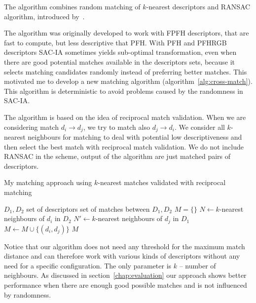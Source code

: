 The algorithm combines random matching of $k$-nearest descriptors and \gls{RANSAC} algorithm, introduced by~\citet{fischler1981ransac}.


The algorithm was originally developed to work with \gls{FPFH} descriptors, that are fast to compute, but less descriptive that \gls{PFH}. With \gls{PFH} and \gls{PFHRGB} descriptors \gls{SAC-IA} sometimes yields sub-optimal transformation, even when there are good potential matches available in the descriptors sets, because it selects matching candidates randomly instead of preferring better matches. This motivated me to develop a new matching algorithm (algorithm~\ref{alg:cross-match}). This algorithm is deterministic to avoid problems caused by the randomness in \gls{SAC-IA}.

The algorithm is based on the idea of reciprocal match validation. When we are considering match $d_i \rightarrow d_j$, we try to match also $d_j \rightarrow d_i$. We consider all $k$-nearest neighbours for matching to deal with potential low descriptiveness and then select the best match with reciprocal match validation. We do not include \gls{RANSAC} in the scheme, output of the algorithm are just matched pairs of descriptors.

\begin{algorithm}
    \caption[Reciprocal $k$-nearest matching]{My matching approach using $k$-nearest matches validated with reciprocal matching}
    \label{alg:cross-match}
    \begin{algorithmic}[1]
        \Require $D_1, D_2$ set of descriptors
        \Ensure set of matches between $D_1, D_2$
            \State $M = \{\}$
                \State $N \gets k$-nearest neighbours of $d_i$ in $D_2$
                    \State $N' \gets k$-nearest neighbours of $d_j$ in $D_1$
                        \State $M \gets M \cup \{(d_i, d_j)\}$
                    \EndIf
                \EndFor
            \EndFor
            \State \Return $M$
        \EndFunction
    \end{algorithmic}
\end{algorithm}

Notice that our algorithm does not need any threshold for the maximum match distance and can therefore work with various kinds of descriptors without any need for a specific configuration. The only parameter is $k$ -- number of neighbours. As discussed in section~\ref{chap:evaluation} our approach shows better performance when there are enough good possible matches and is not influenced by randomness.

